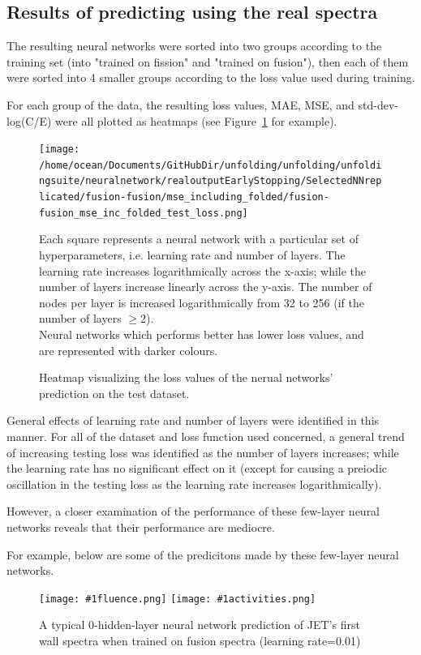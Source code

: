 \documentclass[a4paper, 12pt]{article}
\newcommand{\fluenceandactivities}[1]{
\texttt{[image: \#1fluence.png]}
\texttt{[image: \#1activities.png]}
}
\begin{document}
\subsection{Results of predicting using the real spectra}
The resulting neural networks were sorted into two groups according to the training set (into "trained on fission" and "trained on fusion"), then each of them were sorted into 4 smaller groups according to the loss value used during training.

For each group of the data, the resulting loss values, MAE, MSE, and std-dev-log(C/E) were all plotted as heatmaps (see Figure~\ref{hyperparametersearchTestLoss} for example).

\begin{figure}
\centering
\texttt{[image: /home/ocean/Documents/GitHubDir/unfolding/unfolding/unfoldingsuite/neuralnetwork/realoutputEarlyStopping/SelectedNNreplicated/fusion-fusion/mse\_including\_folded/fusion-fusion\_mse\_inc\_folded\_test\_loss.png]}
\caption{Heatmap visualizing the loss values of the nerual networks' prediction on the test dataset.}\label{hyperparametersearchTestLoss}
Each square represents a neural network with a particular set of hyperparameters, i.e. learning rate and number of layers. The learning rate increases logarithmically across the x-axis; while the number of layers increase linearly across the y-axis. The number of nodes per layer is increased logarithmically from 32 to 256 (if the number of layers $\ge 2$).\\
Neural networks which performs better has lower loss values, and are represented with darker colours.\\
\end{figure}

General effects of learning rate and number of layers were identified in this manner. For all of the dataset and loss function used concerned, a general trend of increasing testing loss was identified as the number of layers increases; while the learning rate has no significant effect on it (except for causing a preiodic oscillation in the testing loss as the learning rate increases logarithmically).

However, a closer examination of the performance of these few-layer neural networks reveals that their performance are mediocre. 

For example, below are some of the predicitons made by these few-layer neural networks.

\begin{figure}[H]
\centering
\fluenceandactivities{/home/ocean/Documents/GitHubDir/unfolding/unfolding/unfoldingsuite/neuralnetwork/realoutputEarlyStopping/SelectedNNreplicated/fusion-fusion-final/0926_1935_0_layerfinal_investigation_2_test_001_}
\caption{A typical 0-hidden-layer neural network prediction of JET's first wall spectra when trained on fusion spectra (learning rate=0.01)}
\end{figure}
\end{document}
